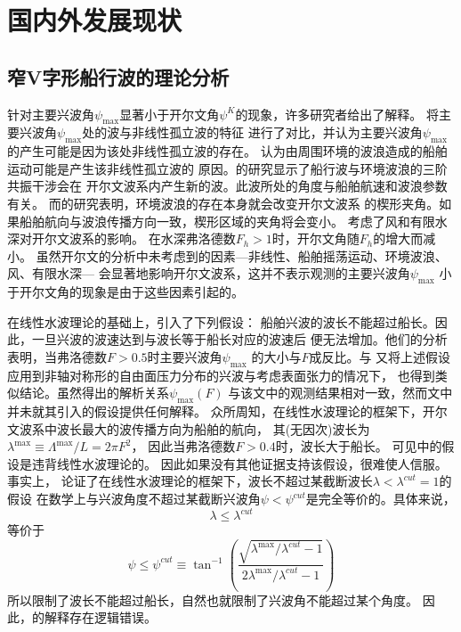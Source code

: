 \section{国内外发展现状}
\label{sec:statofart}

\subsection{窄V字形船行波的理论分析}
针对主要兴波角$\psi_{\max}$显著小于开尔文角$\psi^K$的现象，许多研究者给出了解释。
\parencite{Brown1989Observations}将主要兴波角$\psi_{\max}$处的波与非线性孤立波的特征
进行了对比，并认为主要兴波角$\psi_{\max}$的产生可能是因为该处非线性孤立波的存在。
\parencite{Mei1991Note}认为由周围环境的波浪造成的船舶运动可能是产生该非线性孤立波的
原因。\parencite{Zhu2008Resonant}的研究显示了船行波与环境波浪的三阶共振干涉会在
开尔文波系内产生新的波。此波所处的角度与船舶航速和波浪参数有关。
而\parencite{Shugan2006Kelvin}的研究表明，环境波浪的存在本身就会改变开尔文波系
的楔形夹角。如果船舶航向与波浪传播方向一致，楔形区域的夹角将会变小。
\parencite{Fang2011Kelvin}考虑了风和有限水深对开尔文波系的影响。
在水深弗洛德数$F_h>1$时，开尔文角随$F_h$的增大而减小。
虽然开尔文的分析中未考虑到的因素---非线性、船舶摇荡运动、环境波浪、风、有限水深---
会显著地影响开尔文波系，这并不表示观测的主要兴波角$\psi_{\max}$
小于开尔文角的现象是由于这些因素引起的。

\parencite{Rabaud2013Ship}在线性水波理论的基础上，引入了下列假设：
船舶兴波的波长不能超过船长。因此，一旦兴波的波速达到与波长等于船长对应的波速后
便无法增加。他们的分析表明，当弗洛德数$F>0.5$时主要兴波角$\psi_{\max}$
的大小与$F$成反比。\parencite{Moisy2014Mach}与\parencite{Moisy2014Scaling}
又将上述假设应用到非轴对称形的自由面压力分布的兴波与考虑表面张力的情况下，
也得到类似结论。虽然\parencite{Rabaud2013Ship}得出的解析关系$\psi_{\max}(F)$
与该文中的观测结果相对一致，然而文中并未就其引入的假设提供任何解释。
众所周知，在线性水波理论的框架下，开尔文波系中波长最大的波传播方向为船舶的航向，
其(无因次)波长为$\lambda^{\max}\equiv\Lambda^{\max}/L=2\pi F^2$，
因此当弗洛德数$F>0.4$时，波长大于船长。
可见\parencite{Rabaud2013Ship}中的假设是违背线性水波理论的。
因此如果没有其他证据支持该假设，很难使人信服。事实上，\parencite{He2015Comparison}
论证了在线性水波理论的框架下，波长不超过某截断波长$\lambda<\lambda^{cut}=1$的假设
在数学上与兴波角度不超过某截断兴波角$\psi<\psi^{cut}$是完全等价的。具体来说，
\begin{equation}
  \lambda\le\lambda^{cut}
  \label{eq:rabaudassump}
\end{equation}
等价于
\begin{equation}
  \psi\le\psi^{cut}\equiv\tan^{-1}\left(
  \frac{\sqrt{\lambda^{\max}/\lambda^{cut}-1}}{2\lambda^{\max}/\lambda^{cut}-1}
  \right)
  \label{eq:wavlencut}
\end{equation}
所以限制了波长不能超过船长，自然也就限制了兴波角不能超过某个角度。
因此，\parencite{Rabaud2013Ship}的解释存在逻辑错误。


